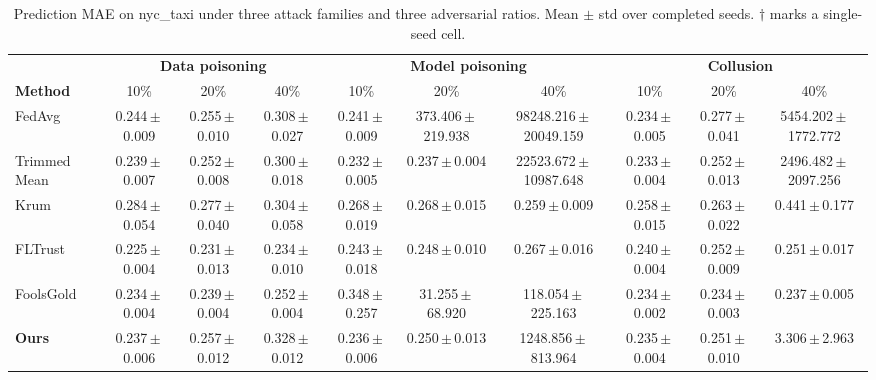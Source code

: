 \begin{table}[t]
\centering
\scriptsize
\caption{Prediction MAE on nyc_taxi under three attack families and three adversarial ratios. Mean $\pm$ std over completed seeds. $\dagger$ marks a single-seed cell.}
\label{tab:main_results}
\begin{tabular}{lccccccccc}
\toprule
& \multicolumn{3}{c}{\textbf{Data poisoning}}& \multicolumn{3}{c}{\textbf{Model poisoning}}& \multicolumn{3}{c}{\textbf{Collusion}} \\
\cmidrule(lr){2-4}\cmidrule(lr){5-7}\cmidrule(lr){8-10}
\textbf{Method} & 10\% & 20\% & 40\% & 10\% & 20\% & 40\% & 10\% & 20\% & 40\% \\
\midrule
FedAvg & 0.244\,$\pm$\,0.009 & 0.255\,$\pm$\,0.010 & 0.308\,$\pm$\,0.027 & 0.241\,$\pm$\,0.009 & 373.406\,$\pm$\,219.938 & 98248.216\,$\pm$\,20049.159 & 0.234\,$\pm$\,0.005 & 0.277\,$\pm$\,0.041 & 5454.202\,$\pm$\,1772.772 \\
Trimmed Mean & 0.239\,$\pm$\,0.007 & 0.252\,$\pm$\,0.008 & 0.300\,$\pm$\,0.018 & 0.232\,$\pm$\,0.005 & 0.237\,$\pm$\,0.004 & 22523.672\,$\pm$\,10987.648 & 0.233\,$\pm$\,0.004 & 0.252\,$\pm$\,0.013 & 2496.482\,$\pm$\,2097.256 \\
Krum & 0.284\,$\pm$\,0.054 & 0.277\,$\pm$\,0.040 & 0.304\,$\pm$\,0.058 & 0.268\,$\pm$\,0.019 & 0.268\,$\pm$\,0.015 & 0.259\,$\pm$\,0.009 & 0.258\,$\pm$\,0.015 & 0.263\,$\pm$\,0.022 & 0.441\,$\pm$\,0.177 \\
FLTrust & 0.225\,$\pm$\,0.004 & 0.231\,$\pm$\,0.013 & 0.234\,$\pm$\,0.010 & 0.243\,$\pm$\,0.018 & 0.248\,$\pm$\,0.010 & 0.267\,$\pm$\,0.016 & 0.240\,$\pm$\,0.004 & 0.252\,$\pm$\,0.009 & 0.251\,$\pm$\,0.017 \\
FoolsGold & 0.234\,$\pm$\,0.004 & 0.239\,$\pm$\,0.004 & 0.252\,$\pm$\,0.004 & 0.348\,$\pm$\,0.257 & 31.255\,$\pm$\,68.920 & 118.054\,$\pm$\,225.163 & 0.234\,$\pm$\,0.002 & 0.234\,$\pm$\,0.003 & 0.237\,$\pm$\,0.005 \\
\textbf{Ours} & 0.237\,$\pm$\,0.006 & 0.257\,$\pm$\,0.012 & 0.328\,$\pm$\,0.012 & 0.236\,$\pm$\,0.006 & 0.250\,$\pm$\,0.013 & 1248.856\,$\pm$\,813.964 & 0.235\,$\pm$\,0.004 & 0.251\,$\pm$\,0.010 & 3.306\,$\pm$\,2.963 \\
\bottomrule
\end{tabular}
\end{table}

